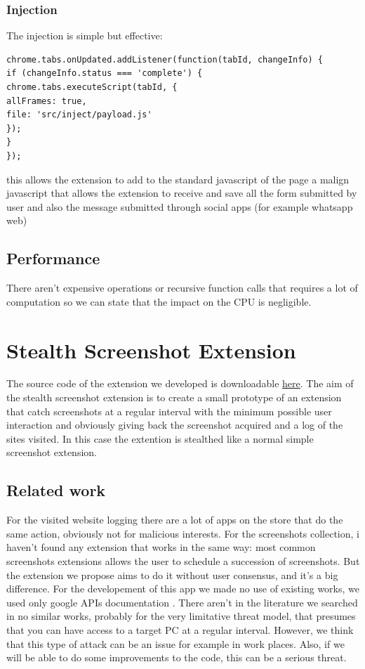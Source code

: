 \documentclass[12pt]{article}
\begin{document}
\begin{multicols}{2}
\subsubsection*{Injection}
The injection is simple but effective:
\begin{lstlisting}
chrome.tabs.onUpdated.addListener(function(tabId, changeInfo) {
if (changeInfo.status === 'complete') {
chrome.tabs.executeScript(tabId, {
allFrames: true, 
file: 'src/inject/payload.js'
});
}
});
\end{lstlisting}
this allows the extension to add to the standard javascript of the page a malign javascript that allows the extension to receive and save all the form submitted by user and also the message submitted through social apps (for example whatsapp web)
\subsection*{Performance}
There aren't expensive operations or recursive function calls that requires a lot of computation so we can state that the impact on the CPU is negligible.
\section*{Stealth Screenshot Extension}
The source code of the extension we developed is downloadable \href{https://github.com/Trexy94/Stealth-screenshot}{here}. The aim of the stealth screenshot extension is to create a small prototype of an extension that catch screenshots at a regular interval with the minimum possible user interaction and obviously giving back the screenshot acquired and a log of the sites visited. In this case the extention is stealthed like a normal simple screenshot extension.
\subsection*{Related work}
For the visited website logging there are a lot of apps on the store that do the same action, obviously not for malicious interests.
For the screenshots collection, i haven't found any extension that works in the same way: most common screenshots extensions allows the user to schedule a succession of screenshots. But the extension we propose aims to do it without user consensus, and it's a big difference.
For the developement of this app we made no use of existing works, we used only google APIs documentation \cite{GoogleDoc}. There aren't in the literature we searched in no similar works, probably for the very limitative threat model, that presumes that you can have access to a target PC at a regular interval. However, we think that this type of attack can be an issue for example in work places. Also, if we will be able to do some improvements to the code, this can be a serious threat.

\end{multicols}
\end{document}
